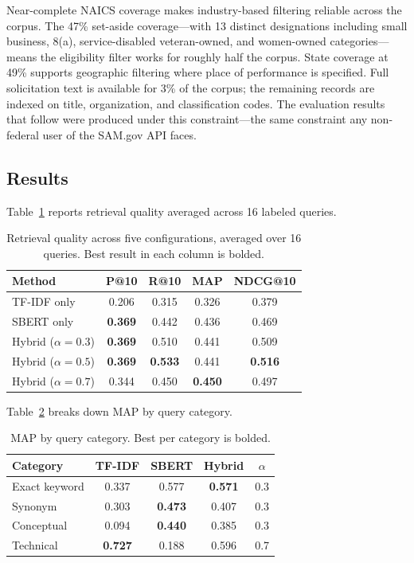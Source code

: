 \documentclass[10pt,twocolumn]{article}
\begin{document}
Near-complete NAICS coverage makes industry-based filtering reliable across the corpus. The 47\% set-aside coverage---with 13 distinct designations including small business, 8(a), service-disabled veteran-owned, and women-owned categories---means the eligibility filter works for roughly half the corpus. State coverage at 49\% supports geographic filtering where place of performance is specified. Full solicitation text is available for 3\% of the corpus; the remaining records are indexed on title, organization, and classification codes. The evaluation results that follow were produced under this constraint---the same constraint any non-federal user of the SAM.gov API faces.

\subsection{Results}

Table~\ref{tab:main-results} reports retrieval quality averaged across 16 labeled queries.

\begin{table}[h]
\centering
\small
\caption{Retrieval quality across five configurations, averaged over 16 queries. Best result in each column is bolded.}
\begin{tabular}{lcccc}
\toprule
Method & P@10 & R@10 & MAP & NDCG@10 \\
\midrule
TF-IDF only & 0.206 & 0.315 & 0.326 & 0.379 \\
SBERT only & \textbf{0.369} & 0.442 & 0.436 & 0.469 \\
Hybrid ($\alpha = 0.3$) & \textbf{0.369} & 0.510 & 0.441 & 0.509 \\
Hybrid ($\alpha = 0.5$) & \textbf{0.369} & \textbf{0.533} & 0.441 & \textbf{0.516} \\
Hybrid ($\alpha = 0.7$) & 0.344 & 0.450 & \textbf{0.450} & 0.497 \\
\bottomrule
\end{tabular}
\label{tab:main-results}
\end{table}

Table~\ref{tab:category-results} breaks down MAP by query category.

\begin{table}[h]
\centering
\small
\caption{MAP by query category. Best per category is bolded.}
\begin{tabular}{lcccc}
\toprule
Category & TF-IDF & SBERT & Hybrid & $\alpha$ \\
\midrule
Exact keyword & 0.337 & 0.577 & \textbf{0.571} & 0.3 \\
Synonym & 0.303 & \textbf{0.473} & 0.407 & 0.3 \\
Conceptual & 0.094 & \textbf{0.440} & 0.385 & 0.3 \\
Technical & \textbf{0.727} & 0.188 & 0.596 & 0.7 \\
\bottomrule
\end{tabular}
\label{tab:category-results}
\end{table}
\end{document}
